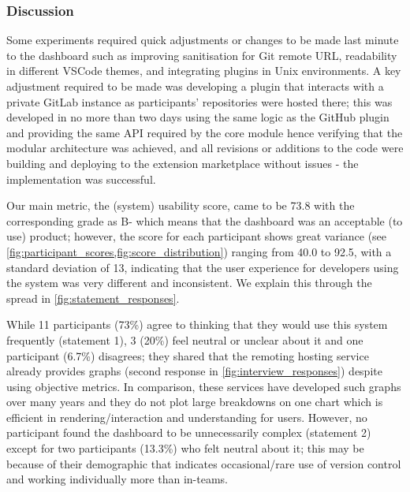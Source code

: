 \documentclass[../mpaper.tex]{subfiles}
\begin{document}
\subsubsection*{Discussion}

Some experiments required quick adjustments or changes to be made last minute to the dashboard such as improving sanitisation for Git remote URL, readability in different VSCode themes, and integrating plugins in Unix environments. A key adjustment required to be made was developing a plugin that interacts with a private GitLab instance as participants' repositories were hosted there; this was developed in no more than two days using the same logic as the GitHub plugin and providing the same API required by the core module hence verifying that the modular architecture was achieved, and all revisions or additions to the code were building and deploying to the extension marketplace without issues - the implementation was successful.

Our main metric, the (system) usability score, came to be 73.8 with the corresponding grade as B- which means that the dashboard was an acceptable (to use) product; however, the score for each participant shows great variance (see \autoref{fig:participant_scores,fig:score_distribution}) ranging from 40.0 to 92.5, with a standard deviation of 13, indicating that the user experience for developers using the system was very different and inconsistent. We explain this through the spread in \autoref{fig:statement_responses}.

While 11 participants (73\%) agree to thinking that they would use this system frequently (statement 1), 3 (20\%) feel neutral or unclear about it and one participant (6.7\%) disagrees; they shared that the remoting hosting service already provides graphs (second response in \autoref{fig:interview_responses}) despite using objective metrics. In comparison, these services have developed such graphs over many years and they do not plot large breakdowns on one chart which is efficient in rendering/interaction and understanding for users. However, no participant found the dashboard to be unnecessarily complex (statement 2) except for two participants (13.3\%) who felt neutral about it; this may be because of their demographic that indicates occasional/rare use of version control and working individually more than in-teams.
\end{document}
